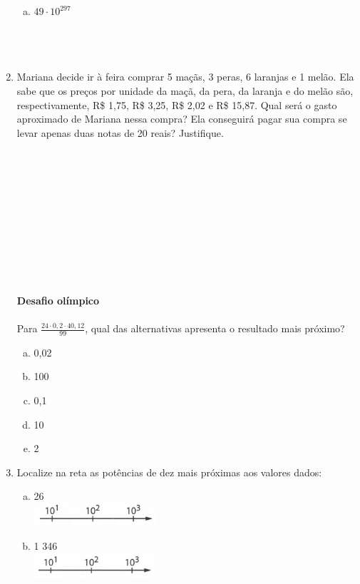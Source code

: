 \documentclass[a4paper,14pt]{article}
\begin{document}
\begin{multicols}{2}
\begin{enumerate}
\begin{enumerate}[a)]
				\item $49 \cdot 10^{297}$ \\\\\\\\
			\end{enumerate}
			\item Mariana decide ir à feira comprar 5 maçãs, 3 peras, 6 laranjas e 1 melão. Ela sabe que os preços por unidade da maçã, da pera, da laranja e do melão são, respectivamente, R\$ 1,75, R\$ 3,25, R\$ 2,02 e R\$ 15,87. Qual será o gasto aproximado de Mariana nessa compra? Ela conseguirá pagar sua compra se levar apenas duas notas de 20 reais? Justifique. \\\\\\\\\\\\\\\\\\\\\\\\
			\textbf{Desafio olímpico} \\\\
			Para $\frac{24 \cdot 0,2 \cdot 40,12}{99}$, qual das alternativas apresenta o resultado mais próximo?
			\begin{enumerate}[a)]
				\item 0,02
				\item 100
				\item 0,1
				\item 10
				\item 2 \newpage
			\end{enumerate}
			\item Localize na reta as potências de dez mais próximas aos valores dados:
			\begin{enumerate}[a)]
				\item 26 \\
				\includegraphics[width=1\linewidth]{6FMA148_imagens/imagem7}
				\item 1 346 \\
				\includegraphics[width=1\linewidth]{6FMA148_imagens/imagem8}

\end{enumerate}
\end{enumerate}
\end{multicols}
\end{document}
